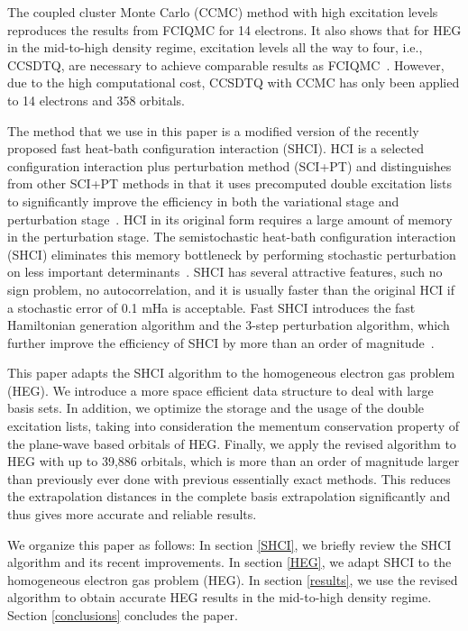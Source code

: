 The coupled cluster Monte Carlo (CCMC) method with high excitation levels reproduces the results from FCIQMC for 14 electrons.
It also shows that for HEG in the mid-to-high density regime, excitation levels all the way to four, i.e., CCSDTQ, are necessary to achieve comparable results as FCIQMC~\cite{neufeld2017study}.
However, due to the high computational cost, CCSDTQ with CCMC has only been applied to 14 electrons and 358 orbitals.

The method that we use in this paper is a modified version of the recently proposed fast heat-bath configuration interaction (SHCI).
HCI is a selected configuration interaction plus perturbation method (SCI+PT) and distinguishes from other SCI+PT methods in that it uses precomputed double excitation lists to significantly improve the efficiency in both the variational stage and perturbation stage~\cite{holmes2016heat}.
HCI in its original form requires a large amount of memory in the perturbation stage.
The semistochastic heat-bath configuration interaction (SHCI) eliminates this memory bottleneck by performing stochastic perturbation on less important determinants~\cite{sharma2017semistochastic}.
SHCI has several attractive features, such no sign problem, no autocorrelation, and it is usually faster than the original HCI if a stochastic error of 0.1 mHa is acceptable.
Fast SHCI introduces the fast Hamiltonian generation algorithm and the 3-step perturbation algorithm, which further improve the efficiency of SHCI by more than an order of magnitude~\cite{li2018fast}.

This paper adapts the SHCI algorithm to the homogeneous electron gas problem (HEG).
We introduce a more space efficient data structure to deal with large basis sets.
In addition, we optimize the storage and the usage of the double excitation lists, taking into consideration the mementum conservation property of the plane-wave based orbitals of HEG.
Finally, we apply the revised algorithm to HEG with up to 39,886 orbitals, which is more than an order of magnitude larger than previously ever done with previous essentially exact methods.
This reduces the extrapolation distances in the complete basis extrapolation significantly and thus gives more accurate and reliable results.

We organize this paper as follows:
In section \ref{SHCI}, we briefly review the SHCI algorithm and its recent improvements.
In section \ref{HEG}, we adapt SHCI to the homogeneous electron gas problem (HEG).
In section \ref{results}, we use the revised algorithm to obtain accurate HEG results in the mid-to-high density regime.
Section \ref{conclusions} concludes the paper.